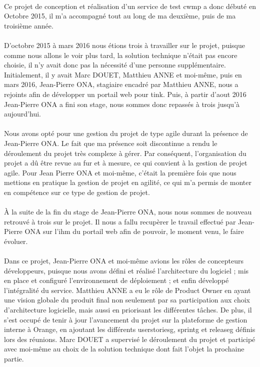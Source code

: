\documentclass[12pt,a4paper]{report}
\begin{document}
\paragraph*{}Ce projet de conception et réalisation d’un service de test \gls{cwmp} a donc débuté en Octobre 2015, il m'a accompagné tout au long de ma deuxième, puis de ma troisième année.
\paragraph*{}D'octobre 2015 à mars 2016 nous étions trois à travailler sur le projet,  puisque comme nous allons le voir plus tard, la solution technique n’était pas encore choisie, il n’y avait donc pas la nécessité d’une personne supplémentaire. Initialement, il y avait Marc DOUET, Matthieu ANNE et moi-même, puis en mars 2016, Jean-Pierre ONA, stagiaire encadré par Matthieu ANNE, nous a rejoints afin de développer un portail web pour \gls{tink}. Puis, à partir d'aout 2016 Jean-Pierre ONA a fini son stage, nous sommes donc repassés à trois jusqu'à aujourd'hui.
\paragraph*{}Nous avons opté pour une gestion du projet de type agile durant la présence de Jean-Pierre ONA. Le fait que ma présence soit discontinue a rendu le déroulement du projet très complexe à gérer. Par conséquent, l’organisation du projet a dû être revue au fur et à mesure, ce qui convient à la gestion de projet agile. Pour Jean Pierre ONA et moi-même, c’était la première fois que nous mettions en pratique la gestion de projet en agilité, ce qui m’a permis de monter en compétence sur ce type de gestion de projet. 
\paragraph*{}À la suite de la fin du stage de Jean-Pierre ONA, nous nous sommes de nouveau retrouvé à trois sur le projet. Il nous a fallu recupèrer le travail effectué par Jean-Pierre ONA sur l'\gls{ihm} du portail web afin de pouvoir, le moment venu, le faire évoluer.
\paragraph*{}Dans ce projet, Jean-Pierre ONA et moi-même avions les rôles de concepteurs développeurs, puisque nous avons défini et réalisé l’architecture du logiciel ; mis en place et configuré l’environnement de déploiement ; et enfin développé l’intégralité du service. Matthieu ANNE a eu le rôle de Product Owner en ayant une vision globale du produit final non seulement par sa participation aux choix d’architecture logicielle, mais aussi en priorisant les différentes tâches. De plus, il s’est occupé de tenir à jour l’avancement du projet sur la plateforme de gestion interne à Orange, en ajoutant les différents \gls{userstoriesg}, \gls{sprintg} et \gls{releaseg} définis lors des réunions. Marc DOUET a supervisé le déroulement du projet et participé avec moi-même au choix de la solution technique dont fait l’objet la prochaine partie. \\
\end{document}
